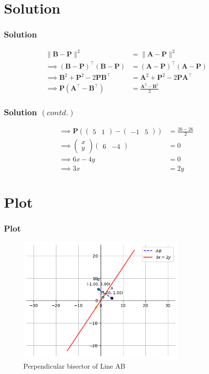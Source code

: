 \documentclass{beamer}
\providecommand{\brak}[1]{\ensuremath{\left(#1\right)}}
\theoremstyle{remark}
\providecommand{\norm}[1]{\lVert#1\rVert}
\newcommand{\myvec}[1]{\ensuremath{\begin{pmatrix}#1\end{pmatrix}}}
\let\vec\mathbf
\numberwithin{equation}{section}
\begin{document}
\section{Solution}
\begin{frame}
\frametitle{Solution}
\begin{align}
	\norm{ \vec B-\vec P }^2 &= \norm{ \vec A -\vec P }^2 \\
	\implies \brak{\vec B-\vec P}^\top\brak{\vec B-\vec P}&= \brak{\vec A-\vec P}^\top\brak{\vec A-\vec P}\\
    \implies \vec B^{2} + \vec P^{2} - 2 \vec P\vec B^\top &= \vec A^2 + \vec P^2 - 2\vec P\vec A^\top \\
    \implies \vec P\brak{\vec A^\top - \vec B^\top} &= \frac{\vec A^2 - \vec B^2}{2}
\end{align}
\end{frame}
\begin{frame}
\frametitle{Solution $\brak{contd.}$}
\begin{align}
 \implies \vec P\brak{\myvec{5 & 1} - \myvec{-1 & 5}} &= \frac{26 - 26}{2} \\
    \implies \myvec{x\\y}\myvec{6 & -4} &= 0\\
    \implies 6x-4y &= 0\\
    \implies 3x &= 2y
\end{align}
\end{frame}
\section{Plot}
\begin{frame}
	\frametitle{Plot}
	\begin{figure}[H]
    \centering
	\includegraphics[width=0.75\textwidth]{plots/plot.png}
    \caption{Perpendicular bisector of Line AB}
    \end{figure}   
%
\end{frame}
\end{document}
